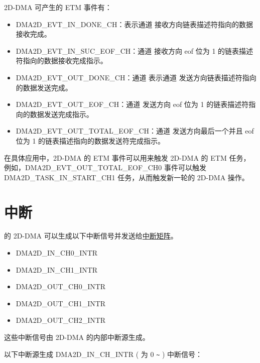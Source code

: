 \documentclass[main\_\_CN.tex]{subfiles}
\begin{document}
2D-DMA 可产生的 ETM 事件有：

\begin{itemize}
\item DMA2D\_EVT\_IN\_DONE\_CH：表示通道  接收方向链表描述符指向的数据接收完成。
\item DMA2D\_EVT\_IN\_SUC\_EOF\_CH：通道  接收方向 eof 位为 1 的链表描述符指向的数据接收完成指示。
\item DMA2D\_EVT\_OUT\_DONE\_CH：通道  表示通道  发送方向链表描述符指向的数据发送完成。
\item DMA2D\_EVT\_OUT\_EOF\_CH：通道  发送方向 eof 位为 1 的链表描述符指向的数据发送完成指示。
\item DMA2D\_EVT\_OUT\_TOTAL\_EOF\_CH：通道  发送方向最后一个并且 eof 位为 1 的链表描述指向的数据发送符完成指示。
\end{itemize}

在具体应用中，2D-DMA 的 ETM 事件可以用来触发 2D-DMA 的 ETM 任务，例如，DMA2D\_EVT\_OUT\_TOTAL\_EOF\_CH0 事件可以触发 DMA2D\_TASK\_IN\_START\_CH1 任务，从而触发新一轮的 2D-DMA 操作。


\section{中断}

\chipname{} 的 2D-DMA 可以生成以下中断信号并发送给\hyperref[mod:intmtrx]{中断矩阵}。

    \begin{itemize}
        \item DMA2D\_IN\_CH0\_INTR
        \item DMA2D\_IN\_CH1\_INTR
        \item DMA2D\_OUT\_CH0\_INTR
        \item DMA2D\_OUT\_CH1\_INTR
        \item DMA2D\_OUT\_CH2\_INTR
    \end{itemize}

这些中断信号由 2D-DMA 的内部中断源生成。

以下中断源生成 DMA2D\_IN\_CH\_INTR ( 为 0 \verb+~+ ) 中断信号：
\end{document}
